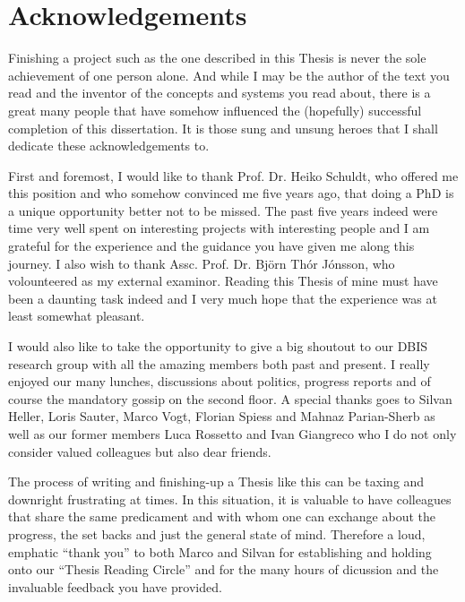 
\chapter{Acknowledgements}

Finishing a project such as the one described in this Thesis is never the sole achievement of one person alone. And while I may be the author of the text you read and the inventor of the concepts and systems you read about, there is a great many people that have somehow influenced the (hopefully) successful completion of this dissertation. It is those sung and unsung heroes that I shall dedicate these acknowledgements to.

First and foremost, I would like to thank Prof. Dr. Heiko Schuldt, who offered me this position and who somehow convinced me five years ago, that doing a PhD is a unique opportunity better not to be missed. The past five years indeed were time very well spent on interesting projects with interesting people and I am grateful for the experience and the guidance you have given me along this journey. I also wish to thank Assc. Prof. Dr. Björn Thór Jónsson, who volounteered as my external examinor. Reading this Thesis of mine must have been a daunting task indeed and I very much hope that the experience was at least somewhat pleasant.

I would also like to take the opportunity to give a big shoutout to our DBIS research group with all the amazing members both past and present. I really enjoyed our many lunches, discussions about politics, progress reports and of course the mandatory gossip on the second floor. A special thanks goes to Silvan Heller, Loris Sauter, Marco Vogt, Florian Spiess and Mahnaz Parian-Sherb as well as our former members Luca Rossetto and Ivan Giangreco who I do not only consider valued colleagues but also dear friends.  

The process of writing and finishing-up a Thesis like this can be taxing and downright frustrating at times. In this situation, it is valuable to have colleagues that share the same predicament and with whom one can exchange about the progress, the set backs and just the general state of mind. Therefore a loud, emphatic ``thank you'' to both Marco and Silvan for establishing and holding onto our ``Thesis Reading Circle'' and for the many hours of dicussion and the invaluable feedback you have provided.

